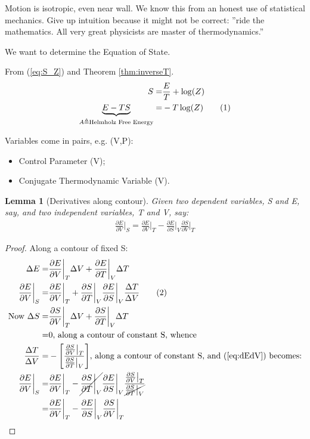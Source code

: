 \documentclass[]{article}
\newcommand\numberthis{\addtocounter{equation}{1}\tag{\theequation}}
\newtheorem{lemma}{Lemma}
\begin{document}
Motion is isotropic, even near wall. We know this from an honest use of statistical mechanics. Give up intuition because it might not be correct: ''ride the mathematics. All very great physicists are master of thermodynamics.''

We want to determine the Equation of State.

From (\ref{eq:S_Z}) and Theorem \ref{thm:inverseT}.
\begin{align*}
S =& \frac{E}{T} + \log(Z)\\
\underbrace{E - TS}_{A\triangleq\text{Helmholz Free Energy}} =& -T \log(Z) \numberthis \label{eq:helmholz}
\end{align*}

Variables come in pairs, e.g. (V,P):
\begin{itemize}
	\item Control Parameter (V);
	\item Conjugate Thermodynamic Variable (V).
\end{itemize}

\begin{lemma}[Derivatives along contour]\label{thm:derivative:contour}
	Given two dependent variables, S and E, say, and two independent variables, T and V, say:
	\begin{align*}
		\frac{\partial E}{\partial V}\bigg|_S = \frac{\partial E}{\partial V}\bigg|_T - 	\frac{\partial E}{\partial S}\bigg|_V \frac{\partial S}{\partial V}\bigg|_T
	\end{align*}
\end{lemma}
\begin{proof}
	Along a contour of fixed S:
	\begin{align*}
		\Delta E =& \frac{\partial E}{\partial V} \bigg|_T \Delta V + \frac{\partial E}{\partial T} \bigg|_V \Delta T\\
		\frac{\partial E}{\partial V} \bigg|_S=& \frac{\partial E}{\partial V} \bigg|_T  + \frac{\partial S}{\partial T} \bigg|_V \frac{\partial E}{\partial S} \bigg|_V \frac{\Delta T}{\Delta V} \numberthis\label{eq:dEdV}\\
		\text{Now }\Delta S =& \frac{\partial S}{\partial V} \bigg|_T \Delta V + \frac{\partial S}{\partial T} \bigg|_V \Delta T\\
		=& 0\text{, along a contour of constant S, whence}\\
		\frac{\Delta T}{\Delta V} =& - \Bigg[\frac{\frac{\partial S}{\partial V}\big|_T}{\frac{\partial S}{\partial T}\big|_V}\Bigg]\text{, along a contour of constant S, and (\ref{eq:dEdV}) becomes:}\\
		\frac{\partial E}{\partial V} \bigg|_S=& \frac{\partial E}{\partial V} \bigg|_T  - \cancel{\frac{\partial S}{\partial T} \bigg|_V} \frac{\partial E}{\partial S} \bigg|_V \frac{\frac{\partial S}{\partial V}\big|_T}{\cancel{\frac{\partial S}{\partial T}\big|_V}}\\
		=& \frac{\partial E}{\partial V} \bigg|_T  -  \frac{\partial E}{\partial S} \bigg|_V \frac{\partial S}{\partial V}\bigg|_T
	\end{align*}
\end{proof}
\end{document}
